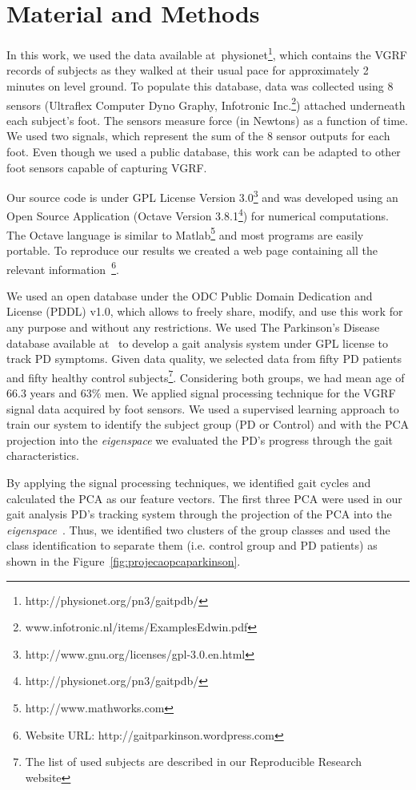 \documentclass[10pt, conference, compsocconf]{IEEEtran}
\begin{document}
\section{Material and Methods}\label{sec:mat_methods}
In this work, we used the data available at~{physionet}\footnote{http://physionet.org/pn3/gaitpdb/}, which contains the VGRF records of subjects as they walked at their usual pace for approximately 2 minutes on level ground. To populate this database, data was collected using 8 sensors (Ultraflex Computer Dyno Graphy, Infotronic Inc.\footnote{www.infotronic.nl/items/ExamplesEdwin.pdf}) attached underneath each subject's foot. The sensors measure force (in Newtons) as a function of time. We used two signals, which represent the sum of the 8 sensor outputs for each foot. Even though we used a public database, this work can be adapted to other foot sensors capable of capturing VGRF.

Our source code is under GPL License Version 3.0\footnote{http://www.gnu.org/licenses/gpl-3.0.en.html} and was developed using an Open Source Application (Octave Version 3.8.1\footnote{http://physionet.org/pn3/gaitpdb/}) for numerical computations. The Octave language is similar to Matlab\footnote{http://www.mathworks.com} and most programs are easily portable. To reproduce our results we created a web page containing all the relevant information~\cite{vandewalle2009}\footnote{Website URL: http://gaitparkinson.wordpress.com}. 



We used an open database under the ODC Public Domain Dedication and License (PDDL) v1.0, which allows to freely share, modify, and use this work for any purpose and without any restrictions. We used The Parkinson's Disease database available at~\cite{physionet} to develop a gait analysis system under GPL license to track PD symptoms. Given data quality, we selected data from fifty PD patients and fifty healthy control subjects\footnote{The list of used subjects are described in our Reproducible Research website}. Considering both groups, we had mean age of 66.3 years and 63$\%$ men. We applied signal processing technique for the VGRF signal data acquired by foot sensors. We used a supervised learning approach to train our system to identify the subject group (PD or Control) and with the PCA projection into the \textit{eigenspace} we evaluated the PD's progress through the gait characteristics.

By applying the signal processing techniques, we identified gait cycles and calculated the PCA as our feature vectors. The first three PCA were used in our gait analysis PD's tracking system through the projection of the PCA into the \textit{eigenspace}~\cite{Shlens05atutorial}. Thus, we identified two clusters of the group classes and used the class identification to separate them (i.e. control group and PD patients) as shown in the Figure~\ref{fig:projecaopcaparkinson}. 
\end{document}
